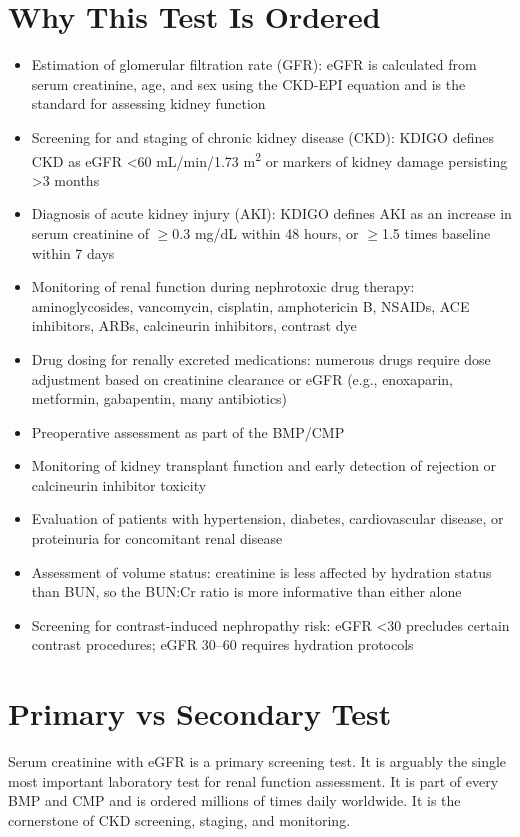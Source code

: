 \section*{Why This Test Is Ordered}
\begin{itemize}
  \item Estimation of glomerular filtration rate (GFR): eGFR is calculated from serum creatinine, age, and sex using the CKD-EPI equation and is the standard for assessing kidney function
  \item Screening for and staging of chronic kidney disease (CKD): KDIGO defines CKD as eGFR <60 mL/min/1.73 m\textsuperscript{2} or markers of kidney damage persisting >3 months \cite{kdigo2013kdigo}
  \item Diagnosis of acute kidney injury (AKI): KDIGO defines AKI as an increase in serum creatinine of $\geq$0.3 mg/dL within 48 hours, or $\geq$1.5 times baseline within 7 days \cite{bellomo2012acute}
  \item Monitoring of renal function during nephrotoxic drug therapy: aminoglycosides, vancomycin, cisplatin, amphotericin B, NSAIDs, ACE inhibitors, ARBs, calcineurin inhibitors, contrast dye
  \item Drug dosing for renally excreted medications: numerous drugs require dose adjustment based on creatinine clearance or eGFR (e.g., enoxaparin, metformin, gabapentin, many antibiotics)
  \item Preoperative assessment as part of the BMP/CMP
  \item Monitoring of kidney transplant function and early detection of rejection or calcineurin inhibitor toxicity
  \item Evaluation of patients with hypertension, diabetes, cardiovascular disease, or proteinuria for concomitant renal disease
  \item Assessment of volume status: creatinine is less affected by hydration status than BUN, so the BUN:Cr ratio is more informative than either alone
  \item Screening for contrast-induced nephropathy risk: eGFR <30 precludes certain contrast procedures; eGFR 30--60 requires hydration protocols
\end{itemize}

\section*{Primary vs Secondary Test}
Serum creatinine with eGFR is a primary screening test. It is arguably the single most important laboratory test for renal function assessment. It is part of every BMP and CMP and is ordered millions of times daily worldwide. It is the cornerstone of CKD screening, staging, and monitoring.

